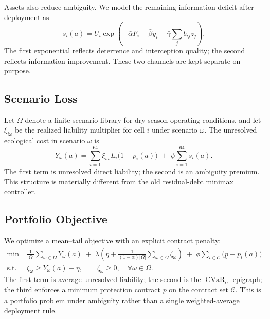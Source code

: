 Assets also reduce ambiguity. We model the remaining information deficit after deployment as
\begin{equation}
s_i(a)
=
U_i\exp\!\left(
-\bar\alpha F_i
-\bar\beta y_i
-\bar\gamma\sum_j b_{ij}z_j
\right).
\label{eq:uncertainty}
\end{equation}
The first exponential reflects deterrence and interception quality; the second reflects information improvement. These two channels are kept separate on purpose.

\subsection{Scenario Loss}
Let \(\Omega\) denote a finite scenario library for dry-season operating conditions, and let \(\xi_{i\omega}\) be the realized liability multiplier for cell \(i\) under scenario \(\omega\). The unresolved ecological cost in scenario \(\omega\) is
\begin{equation}
Y_\omega(a)
=
\sum_{i=1}^{64}\xi_{i\omega}L_i\bigl(1-p_i(a)\bigr)
\;+\;
\psi\sum_{i=1}^{64}s_i(a).
\label{eq:residual}
\end{equation}
The first term is unresolved direct liability; the second is an ambiguity premium. This structure is materially different from the old residual-debt minimax controller.

\subsection{Portfolio Objective}
We optimize a mean--tail objective with an explicit contract penalty:
\begin{align}
\min\;&
\frac{1}{|\Omega|}\sum_{\omega\in\Omega}Y_\omega(a)
\;+\;
\lambda\left(
\eta + \frac{1}{(1-\alpha)|\Omega|}\sum_{\omega\in\Omega}\zeta_\omega
\right)
\;+\;
\phi\sum_{i\in\mathcal{C}}\bigl(\underline p-p_i(a)\bigr)_+
\label{eq:obj}
\\
\text{s.t.}\;&
\zeta_\omega \ge Y_\omega(a)-\eta,\qquad \zeta_\omega\ge 0,\quad \forall \omega\in\Omega.
\label{eq:obj_stage1}
\end{align}
The first term is average unresolved liability; the second is the \(\operatorname{CVaR}_\alpha\) epigraph; the third enforces a minimum protection contract \(\underline p\) on the contract set \(\mathcal{C}\). This is a portfolio problem under ambiguity rather than a single weighted-average deployment rule.

